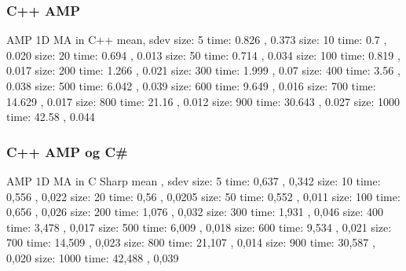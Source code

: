 \subsubsection{C++ AMP}
AMP 1D MA in C++  mean, sdev \newline
size: 5 time: 0.826 , 0.373 \newline
size: 10 time: 0.7 , 0.020 \newline
size: 20 time: 0.694 , 0.013 \newline
size: 50 time: 0.714 , 0.034 \newline
size: 100 time: 0.819 , 0.017 \newline
size: 200 time: 1.266 , 0.021 \newline
size: 300 time: 1.999 , 0.07 \newline
size: 400 time: 3.56 , 0.038 \newline
size: 500 time: 6.042 , 0.039 \newline
size: 600 time: 9.649 , 0.016 \newline
size: 700 time: 14.629 , 0.017 \newline
size: 800 time: 21.16 , 0.012 \newline
size: 900 time: 30.643 , 0.027 \newline
size: 1000 time: 42.58 , 0.044 \newline



\subsubsection{C++ AMP og C\#}
AMP 1D MA in C Sharp  mean  , sdev  \newline
size: 5 time: 0,637 , 0,342 \newline
size: 10 time: 0,556 , 0,022 \newline
size: 20 time: 0,56 , 0,0205 \newline
size: 50 time: 0,552 , 0,011 \newline
size: 100 time: 0,656 , 0,026 \newline
size: 200 time: 1,076 , 0,032 \newline
size: 300 time: 1,931 , 0,046 \newline
size: 400 time: 3,478 , 0,017 \newline
size: 500 time: 6,009 , 0,018 \newline
size: 600 time: 9,534 , 0,021 \newline
size: 700 time: 14,509 , 0,023 \newline
size: 800 time: 21,107 , 0,014 \newline
size: 900 time: 30,587 , 0,020 \newline
size: 1000 time: 42,488 , 0,039 \newline

